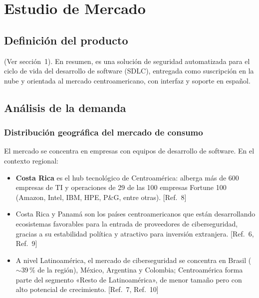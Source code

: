\section{Estudio de Mercado}

\subsection{Definición del producto}
(Ver sección~1). En resumen, \NombreProducto{} es una solución de seguridad
automatizada para el ciclo de vida del desarrollo de software (SDLC), entregada como
suscripción en la nube y orientada al mercado centroamericano, con interfaz y soporte
en español.

\subsection{Análisis de la demanda}

\subsubsection{Distribución geográfica del mercado de consumo}
El mercado se concentra en empresas con equipos de desarrollo de software. En el
contexto regional:

\begin{itemize}
  \item \textbf{Costa Rica} es el hub tecnológico de Centroamérica: alberga más de 600
        empresas de TI y operaciones de 29 de las 100 empresas Fortune 100 (Amazon,
        Intel, IBM, HPE, P\&G, entre otras). [Ref.~8]
  \item Costa Rica y Panamá son los países centroamericanos que están desarrollando
        ecosistemas favorables para la entrada de proveedores de ciberseguridad,
        gracias a su estabilidad política y atractivo para inversión extranjera.
        [Ref.~6, Ref.~9]
  \item A nivel Latinoamérica, el mercado de ciberseguridad se concentra en Brasil
        ($\sim$39\,\% de la región), México, Argentina y Colombia; Centroamérica forma
        parte del segmento «Resto de Latinoamérica», de menor tamaño pero con alto
        potencial de crecimiento. [Ref.~7, Ref.~10]
\end{itemize}

